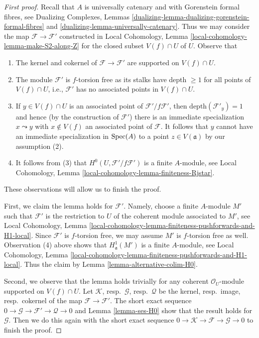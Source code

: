 \begin{proof}[First proof]
Recall that $A$ is universally catenary and with Gorenstein
formal fibres, see Dualizing Complexes, Lemmas
\ref{dualizing-lemma-dualizing-gorenstein-formal-fibres} and
\ref{dualizing-lemma-universally-catenary}. Thus we may consider the map
$\mathcal{F} \to \mathcal{F}'$ constructed in
Local Cohomology, Lemma \ref{local-cohomology-lemma-make-S2-along-Z}
for the closed subset $V(f) \cap U$ of $U$.
Observe that
\begin{enumerate}
\item The kernel and cokernel of $\mathcal{F} \to \mathcal{F}'$
are supported on $V(f) \cap U$.
\item The module $\mathcal{F}'$ is $f$-torsion free as its stalks have
depth $\geq 1$ for all points of $V(f) \cap U$, i.e., $\mathcal{F}'$
has no associated points in $V(f) \cap U$.
\item If $y \in V(f) \cap U$ is an associated point of
$\mathcal{F}'/f\mathcal{F}'$, then
$\text{depth}(\mathcal{F}'_y) = 1$
and hence (by the construction of $\mathcal{F}'$)
there is an immediate specialization $x \leadsto y$
with $x \not \in V(f)$ an associated point of $\mathcal{F}$.
It follows that $y$ cannot have
an immediate specialization in $\mathop{\mathrm{Spec}}(A)$
to a point $z \in V(\mathfrak a)$ by our assumption (2).
\item It follows from (3) that $H^0(U, \mathcal{F}'/f\mathcal{F}')$
is a finite $A$-module, see
Local Cohomology, Lemma \ref{local-cohomology-lemma-finiteness-Rjstar}.
\end{enumerate}
These observations will allow us to finish the proof.

\medskip\noindent
First, we claim the lemma holds for $\mathcal{F}'$.
Namely, choose a finite $A$-module $M'$ such that $\mathcal{F}'$
is the restriction
to $U$ of the coherent module associated to $M'$, see Local Cohomology,
Lemma \ref{local-cohomology-lemma-finiteness-pushforwards-and-H1-local}.
Since $\mathcal{F}'$ is $f$-torsion free, we may assume $M'$
is $f$-torsion free as well. Observation (4) above shows that
$H^1_\mathfrak a(M')$ is a finite $A$-module, see Local Cohomology,
Lemma \ref{local-cohomology-lemma-finiteness-pushforwards-and-H1-local}.
Thus the claim by Lemma \ref{lemma-alternative-colim-H0}.

\medskip\noindent
Second, we observe that the lemma holds trivially for any coherent
$\mathcal{O}_U$-module supported on $V(f) \cap U$.
Let $\mathcal{K}$, resp.\ $\mathcal{G}$, resp.\ $\mathcal{Q}$
be the kernel, resp.\ image, resp.\ cokernel of the map
$\mathcal{F} \to \mathcal{F}'$.
The short exact sequence
$0 \to \mathcal{G} \to \mathcal{F}' \to \mathcal{Q} \to 0$
and Lemma \ref{lemma-ses-H0} show that the result holds for
$\mathcal{G}$. Then we do this again with the short exact sequence
$0 \to \mathcal{K} \to \mathcal{F} \to \mathcal{G} \to 0$
to finish the proof.
\end{proof}

